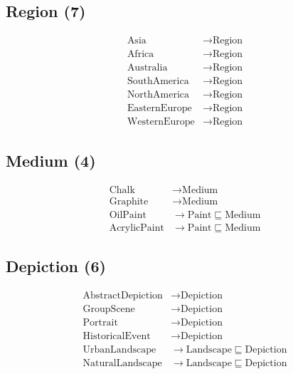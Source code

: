     \subsection{Region (7)}
        \begin{align*}
        \text{Asia} &\to \text{Region}\\
        \text{Africa} &\to \text{Region}\\
        \text{Australia} &\to \text{Region}\\
        \text{SouthAmerica} &\to \text{Region}\\
        \text{NorthAmerica} &\to \text{Region}\\
        \text{EasternEurope} &\to \text{Region}\\
        \text{WesternEurope} &\to \text{Region}
        \end{align*}
    \subsection{Medium (4)}
        \begin{align*}
        \text{Chalk} &\to \text{Medium}\\
        \text{Graphite} &\to \text{Medium}\\
        \text{OilPaint} &\to \text{Paint} \sqsubseteq \text{Medium}\\
        \text{AcrylicPaint} &\to \text{Paint} \sqsubseteq \text{Medium}
        \end{align*}
    \subsection{Depiction (6)}
        \begin{align*}
        \text{AbstractDepiction} &\to \text{Depiction}\\
        \text{GroupScene} &\to \text{Depiction}\\
        \text{Portrait} &\to \text{Depiction}\\
        \text{HistoricalEvent} &\to \text{Depiction}\\
        \text{UrbanLandscape} &\to \text{Landscape}\sqsubseteq \text{Depiction}\\
        \text{NaturalLandscape} &\to \text{Landscape}\sqsubseteq \text{Depiction}\\
        \end{align*}
